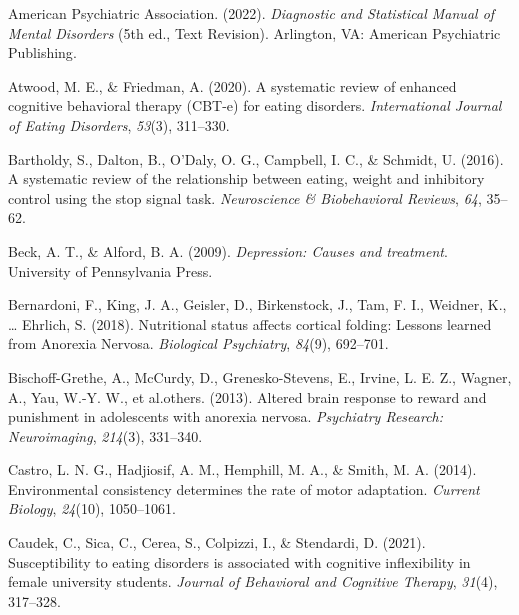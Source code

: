 \documentclass[
  man,floatsintext]{apa6}
\newlength{\cslhangindent}
\newlength{\cslentryspacingunit} %
\newenvironment{CSLReferences}[2] %
 {%
  \setlength{\parindent}{0pt}
  \ifodd #1
  \let\oldpar\par
  \def\par{\hangindent=\cslhangindent\oldpar}
  \fi
  \setlength{\parskip}{#2\cslentryspacingunit}
 }%
 {}
\begin{document}
\hypertarget{refs}{}
\begin{CSLReferences}{1}{0}
\leavevmode{}%
American Psychiatric Association. (2022). \emph{{Diagnostic and Statistical Manual of Mental Disorders}} (5th ed., Text Revision). Arlington, VA: {American Psychiatric Publishing}.

\leavevmode{}%
Atwood, M. E., \& Friedman, A. (2020). A systematic review of enhanced cognitive behavioral therapy (CBT-e) for eating disorders. \emph{International Journal of Eating Disorders}, \emph{53}(3), 311--330.

\leavevmode{}%
Bartholdy, S., Dalton, B., O'Daly, O. G., Campbell, I. C., \& Schmidt, U. (2016). A systematic review of the relationship between eating, weight and inhibitory control using the stop signal task. \emph{Neuroscience \& Biobehavioral Reviews}, \emph{64}, 35--62.

\leavevmode{}%
Beck, A. T., \& Alford, B. A. (2009). \emph{Depression: Causes and treatment}. University of Pennsylvania Press.

\leavevmode{}%
Bernardoni, F., King, J. A., Geisler, D., Birkenstock, J., Tam, F. I., Weidner, K., \ldots{} Ehrlich, S. (2018). Nutritional status affects cortical folding: {Lessons} learned from {Anorexia} {Nervosa}. \emph{Biological Psychiatry}, \emph{84}(9), 692--701.

\leavevmode{}%
Bischoff-Grethe, A., McCurdy, D., Grenesko-Stevens, E., Irvine, L. E. Z., Wagner, A., Yau, W.-Y. W., et al.others. (2013). Altered brain response to reward and punishment in adolescents with anorexia nervosa. \emph{Psychiatry Research: Neuroimaging}, \emph{214}(3), 331--340.

\leavevmode{}%
Castro, L. N. G., Hadjiosif, A. M., Hemphill, M. A., \& Smith, M. A. (2014). Environmental consistency determines the rate of motor adaptation. \emph{Current Biology}, \emph{24}(10), 1050--1061.

\leavevmode{}%
Caudek, C., Sica, C., Cerea, S., Colpizzi, I., \& Stendardi, D. (2021). Susceptibility to eating disorders is associated with cognitive inflexibility in female university students. \emph{Journal of Behavioral and Cognitive Therapy}, \emph{31}(4), 317--328.


\end{CSLReferences}
\end{document}
